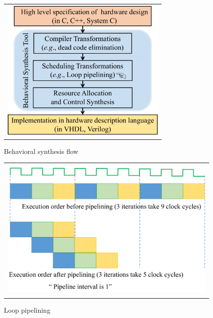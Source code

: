 \begin{figure}[t!]
\begin{center}
\begin{tabular}{c}
\includegraphics[height=2.8in]{fig-proposal/behavioral-synthesis-intro}
\end{tabular}

\end{center}
\caption{Behavioral synthesis flow}
\label{fig:behavioral-synthesis-flow}
\end{figure}

\begin{figure}[t!]
\begin{center}
\begin{tabular}{c}
\includegraphics[height=2.8in]{fig-proposal/simple-pipeline}
\end{tabular}
\end{center}
\caption{Loop pipelining}
\label{fig:simple-pipeline}
\end{figure}

